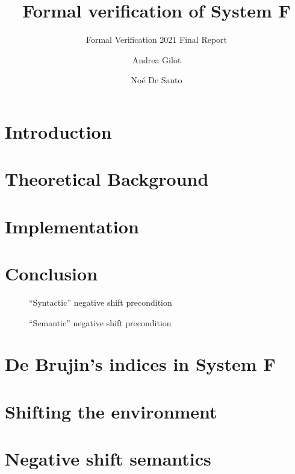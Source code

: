 \documentclass[sigplan,screen,nonacm,natbib=false,acmthm]{acmart}
\title{Formal verification of System F}
\subtitle{Formal Verification 2021 Final Report}
\author{Andrea Gilot}
\affiliation{
    \country{}
}
\author{No\'{e} De Santo}
\affiliation{
    \country{}
}
\begin{document}
\maketitle

\section{Introduction}


\section{Theoretical Background}


\section{Implementation}


\section{Conclusion}


\printbibliography{}

\newpage
\null
\newpage

\appendix

\begin{figure*}
    \begin{subfigure}{0.48\linewidth}
        \centering
        
        \caption{``Syntactic'' negative shift precondition}
        \label{fig:synt_shift}
    \end{subfigure}
    \hfill
    \begin{subfigure}{0.48\linewidth}
        \centering
        
        \caption{``Semantic'' negative shift precondition}
        \label{fig:sem_shift}
    \end{subfigure}
\end{figure*}

\section{De Brujin's indices in System F}\label{sec:sysf_bruijn}


\section{Shifting the environment}\label{sec:ttabs}


\section{Negative shift semantics}\label{sec:negshift}


\begin{figure*}
    \vspace{0.3em}
    \begin{subfigure}{\linewidth}
    
    \end{subfigure}
    \caption{Definition of shift and substitution}
    \label{fig:def_shifts}
\end{figure*}
\end{document}
